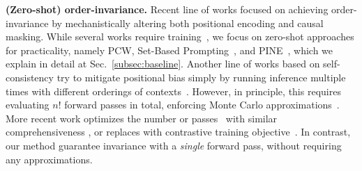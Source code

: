 \noindent \textbf{(Zero-shot) order-invariance.}
Recent line of works focused on achieving order-invariance by mechanistically altering both positional encoding and causal masking.
While several works require training~\cite{junqing2023never, zhu2023judgelm}, we focus on zero-shot approaches for practicality, namely
PCW, Set-Based Prompting~\cite{pcw, setbasedprompting}, and PINE~\cite{pine}, which we explain in detail at Sec.~\ref{subsec:baseline}. %
Another line of works based on self-consistency try to mitigate positional bias simply by running inference multiple times with different orderings of contexts~\cite{zheng2024large}. However, in principle, this requires evaluating \(n!\) forward passes in total, enforcing Monte Carlo approximations~\citep{tang2024middlepermutationselfconsistencyimproves}. More recent work optimizes the number or passes~\citep{lee2024inference} with similar comprehensiveness \citep{hwang2007optimizing}, or replaces with contrastive training objective~\cite{lee2024cord}. In contrast, our method guarantee invariance with a \textit{single} forward pass, without requiring any approximations.